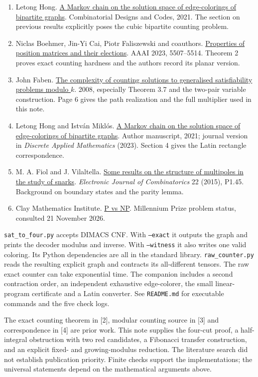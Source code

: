 \documentclass[11pt,letterpaper]{article}
\newcommand{\subx}[1]{\par\medskip{\large\bfseries\color{green}#1}\par\nobreak}
\newcommand{\refx}[2]{\href{#1}{#2}}
\begin{document}
\begin{enumerate}
\item Letong Hong. \refx{https://cdc2020-math.uniri.hr/wp-content/uploads/2021/07/talk_hong.pdf}{A Markov chain on the solution space of edge-colorings of bipartite graphs}. Combinatorial Designs and Codes, 2021. The section on previous results explicitly poses the cubic bipartite counting problem.
\item Niclas Boehmer, Jin-Yi Cai, Piotr Faliszewski and coauthors. \refx{https://ojs.aaai.org/index.php/AAAI/article/download/25684/25456}{Properties of position matrices and their elections}. AAAI 2023, 5507--5514. Theorem 2 proves exact counting hardness and the authors record its planar version.
\item John Faben. \refx{https://arxiv.org/abs/0809.1836}{The complexity of counting solutions to generalised satisfiability problems modulo \(k\)}. 2008, especially Theorem 3.7 and the two-pair variable construction. Page 6 gives the path realization and the full multiplier used in this note.
\item Letong Hong and István Miklós. \refx{https://real.mtak.hu/191308/1/2103.11990v1.pdf}{A Markov chain on the solution space of edge-colorings of bipartite graphs}. Author manuscript, 2021; journal version in \emph{Discrete Applied Mathematics} (2023). Section 4 gives the Latin rectangle correspondence.
\item M. A. Fiol and J. Vilaltella. \refx{https://doi.org/10.37236/3629}{Some results on the structure of multipoles in the study of snarks}. \emph{Electronic Journal of Combinatorics} 22 (2015), P1.45. Background on boundary states and the parity lemma.
\item Clay Mathematics Institute. \refx{https://www.claymath.org/millennium/p-vs-np/}{P vs NP}. Millennium Prize problem status, consulted 21 November 2026.
\end{enumerate}
\subx{Running the companion archive}
\texttt{sat\_to\_four.py} accepts DIMACS CNF. With \texttt{--exact} it outputs the graph and prints the decoder modulus and inverse. With \texttt{--witness} it also writes one valid coloring. Its Python dependencies are all in the standard library. \texttt{raw\_counter.py} reads the resulting explicit graph and contracts its all-different tensors. The raw exact counter can take exponential time. The companion includes a second contraction order, an independent exhaustive edge-colorer, the small linear-program certificate and a Latin converter. See \texttt{README.md} for executable commands and the five check logs.
\subx{Scope and attribution}
The exact counting theorem in [2], modular counting source in [3] and correspondence in [4] are prior work. This note supplies the four-cut proof, a half-integral obstruction with two red candidates, a Fibonacci transfer construction, and an explicit fixed- and growing-modulus reduction. The literature search did not establish publication priority. Finite checks support the implementations; the universal statements depend on the mathematical arguments above.
\end{document}
